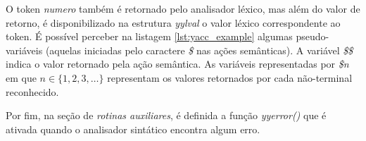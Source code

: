 O token \emph{numero} também é retornado pelo analisador léxico, mas além do
valor de retorno, é disponibilizado na estrutura \emph{yylval} o valor léxico
correspondente ao token. É possível perceber na listagem \ref{lst:yacc_example}
algumas pseudo-variáveis (aquelas iniciadas pelo caractere \emph{\$} nas ações
semânticas). A variável \emph{\$\$} indica o valor retornado pela ação
semântica. As variáveis representadas por \emph{\$n} em que $n \in \{1, 2, 3,
\dotsc\}$ representam os valores retornados por cada não-terminal reconhecido.

Por fim, na seção de \emph{rotinas auxiliares}, é definida a função
\emph{yyerror()} que é ativada quando o analisador sintático encontra algum
erro.
